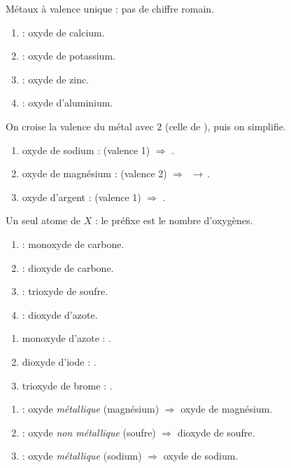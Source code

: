 \documentclass[11pt,a4paper]{article}
\begin{document}
\begin{corrige}
Métaux à valence unique : pas de chiffre romain.
\begin{enumerate}[label=\alph*)]
  \item {} : oxyde de calcium.
  \item {} : oxyde de potassium.
  \item {} : oxyde de zinc.
  \item {} : oxyde d'aluminium.
\end{enumerate}
\end{corrige}

\begin{corrige}
On croise la valence du métal avec $2$ (celle de ), puis on simplifie.
\begin{enumerate}[label=\alph*)]
  \item oxyde de sodium :  (valence 1) $\Rightarrow$ .
  \item oxyde de magnésium :  (valence 2) $\Rightarrow$ \,$\to$\,.
  \item oxyde d'argent :  (valence 1) $\Rightarrow$ .
\end{enumerate}
\end{corrige}

\begin{corrige}
Un seul atome de $X$ : le préfixe est le nombre d'oxygènes.
\begin{enumerate}[label=\alph*)]
  \item {} : monoxyde de carbone.
  \item {} : dioxyde de carbone.
  \item {} : trioxyde de soufre.
  \item {} : dioxyde d'azote.
\end{enumerate}
\end{corrige}

\begin{corrige}
\begin{enumerate}[label=\alph*)]
  \item monoxyde d'azote : .
  \item dioxyde d'iode : .
  \item trioxyde de brome : .
\end{enumerate}
\end{corrige}

\begin{corrige}
\begin{enumerate}[label=\alph*)]
  \item {} : oxyde \emph{métallique} (magnésium) $\Rightarrow$ oxyde de magnésium.
  \item {} : oxyde \emph{non métallique} (soufre) $\Rightarrow$ dioxyde de soufre.
  \item {} : oxyde \emph{métallique} (sodium) $\Rightarrow$ oxyde de sodium.
\end{enumerate}
\end{corrige}
\end{document}
